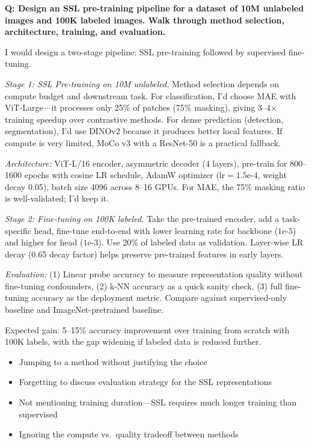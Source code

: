 \begin{interviewq}
\textbf{Q: Design an SSL pre-training pipeline for a dataset of 10M unlabeled images and 100K labeled images. Walk through method selection, architecture, training, and evaluation.}

 \quad {} \quad \badgefreq{\freqhigh}

\stronganswer I would design a two-stage pipeline: SSL pre-training followed by supervised fine-tuning.

\textit{Stage 1: SSL Pre-training on 10M unlabeled.} Method selection depends on compute budget and downstream task. For classification, I'd choose MAE with ViT-Large---it processes only 25\% of patches (75\% masking), giving 3--4$\times$ training speedup over contrastive methods. For dense prediction (detection, segmentation), I'd use DINOv2 because it produces better local features. If compute is very limited, MoCo v3 with a ResNet-50 is a practical fallback.

\textit{Architecture:} ViT-L/16 encoder, asymmetric decoder (4 layers), pre-train for 800--1600 epochs with cosine LR schedule, AdamW optimizer ($\text{lr}=1.5\text{e-}4$, weight decay 0.05), batch size 4096 across 8--16 GPUs. For MAE, the 75\% masking ratio is well-validated; I'd keep it.

\textit{Stage 2: Fine-tuning on 100K labeled.} Take the pre-trained encoder, add a task-specific head, fine-tune end-to-end with lower learning rate for backbone ($1\text{e-}5$) and higher for head ($1\text{e-}3$). Use 20\% of labeled data as validation. Layer-wise LR decay (0.65 decay factor) helps preserve pre-trained features in early layers.

\textit{Evaluation:} (1) Linear probe accuracy to measure representation quality without fine-tuning confounders, (2) k-NN accuracy as a quick sanity check, (3) full fine-tuning accuracy as the deployment metric. Compare against supervised-only baseline and ImageNet-pretrained baseline.

Expected gain: 5--15\% accuracy improvement over training from scratch with 100K labels, with the gap widening if labeled data is reduced further.

\redflags
\begin{itemize}
    \item Jumping to a method without justifying the choice
    \item Forgetting to discuss evaluation strategy for the SSL representations
    \item Not mentioning training duration---SSL requires much longer training than supervised
    \item Ignoring the compute vs.\ quality tradeoff between methods
\end{itemize}


\end{interviewq}
